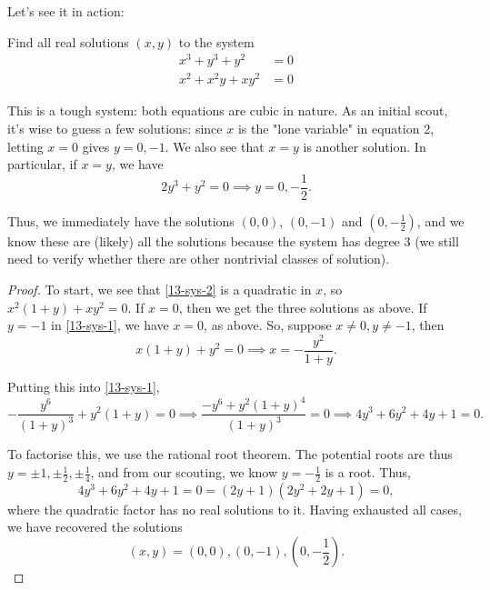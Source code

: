 \documentclass[../jarvis.tex]{subfiles}
\begin{document}
Let's see it in action:
\begin{example}[2021 SMO(S) P22]
Find all real solutions $(x,y)$ to the system
\begin{align}
    x^3+y^3+y^2&=0 \label{13-sys-1} \\
    x^2+x^2y+xy^2&=0 \label{13-sys-2}
\end{align}
\end{example}
This is a tough system: both equations are cubic in nature. As an initial scout, it's wise to guess a few solutions: since $x$ is the "lone variable" in equation 2, letting $x=0$ gives $y=0, -1$. We also see that $x=y$ is another solution. In particular, if $x=y$, we have $$2y^3+y^2=0 \implies y=0, -\frac{1}{2}.$$

Thus, we immediately have the solutions $(0,0)$, $(0,-1)$ and $(0, -\frac{1}{2})$, and we know these are (likely) all the solutions because the system has degree 3 (we still need to verify whether there are other nontrivial classes of solution).

\begin{proof}
    To start, we see that \eqref{13-sys-2} is a quadratic in $x$, so $x^2(1+y)+xy^2=0.$ If $x=0$, then we get the three solutions as above. If $y=-1$ in \eqref{13-sys-1}, we have $x=0$, as above. So, suppose $x\neq 0, y\neq -1$, then
$$x(1+y)+y^2=0 \implies x=-\frac{y^2}{1+y}.$$

Putting this into \eqref{13-sys-1}, 
$$-\frac{y^6}{(1+y)^3}+y^2(1+y)=0 \implies \frac{-y^6+y^2(1+y)^4}{(1+y)^3}=0 \implies 4y^3+6y^2+4y+1=0.$$

To factorise this, we use the rational root theorem. The potential roots are thus $y=\pm 1, \pm \frac{1}{2}, \pm\frac{1}{4}$, and from our scouting, we know $y=-\frac{1}{2}$ is a root. Thus,
$$4y^3+6y^2+4y+1=0=(2y+1)(2y^2+2y+1)=0,$$
where the quadratic factor has no real solutions to it. Having exhausted all cases, we have recovered the solutions
$$\boxed{(x,y)=(0,0), (0,-1), (0,-\frac{1}{2})}.$$
\end{proof}
\end{document}
